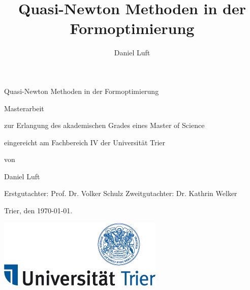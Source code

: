 \documentclass[bibliography=totoc,12pt,a4paper]{scrartcl}
\theoremstyle{exampstyle}
\numberwithin{equation}{section}
\begin{document}
\title{Quasi-Newton Methoden in der Formoptimierung}

\author{Daniel Luft}

  \pagestyle{empty}

  \begin{titlepage}

    \vspace*{2cm} 

 \begin{center} \large 
    
    \vspace*{2cm}

    {\huge Quasi-Newton Methoden in der Formoptimierung}
    \vspace*{2.5cm}
	
  \end{center}
  
	Masterarbeit
	\newline

	zur Erlangung des akademischen Grades eines \newline
	Master of Science
	\newline
	
	eingereicht am Fachbereich IV \newline
	der Universität Trier	
	\newline
	
	von	
	\newline
	
    Daniel Luft
    \newline
    
	Erstgutachter:  Prof. Dr. Volker Schulz \newline
	Zweitgutachter: Dr. Kathrin Welker 
	\newline
	
	Trier, den \today.

	
	
	\hspace{10cm}\vspace{-2cm}\includegraphics[scale=0.4]{Logo-Uni-Trier.jpg}

\end{titlepage}
\newpage
\end{document}
